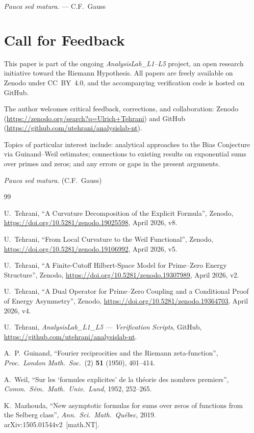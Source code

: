 \documentclass[11pt]{article}
\begin{document}
\emph{Pauca sed matura.} --- C.F.~Gauss

\section*{Call for Feedback}

This paper is part of the ongoing \textit{AnalysisLab\_L1--L5} project,
an open research initiative toward the Riemann Hypothesis.
All papers are freely available on Zenodo under CC~BY~4.0,
and the accompanying verification code is hosted on GitHub.

The author welcomes critical feedback, corrections, and collaboration:
Zenodo (\url{https://zenodo.org/search?q=Ulrich+Tehrani})
and GitHub (\url{https://github.com/utehrani/analysislab-nt}).

Topics of particular interest include: analytical approaches to the
Bias Conjecture via Guinand--Weil estimates; connections to existing
results on exponential sums over primes and zeros; and any errors or
gaps in the present arguments.

\noindent\textit{Pauca sed matura.} (C.F.\ Gauss)

\begin{thebibliography}{99}

U.~Tehrani,
``A Curvature Decomposition of the Explicit Formula'',
Zenodo, \url{https://doi.org/10.5281/zenodo.19025598},
April 2026, v8.

U.~Tehrani,
``From Local Curvature to the Weil Functional'',
Zenodo, \url{https://doi.org/10.5281/zenodo.19106992},
April 2026, v5.

U.~Tehrani,
``A Finite-Cutoff Hilbert-Space Model
for Prime--Zero Energy Structure'',
Zenodo, \url{https://doi.org/10.5281/zenodo.19307989},
April 2026, v2.

U.~Tehrani,
``A Dual Operator for Prime--Zero Coupling
and a Conditional Proof of Energy Asymmetry'',
Zenodo, \url{https://doi.org/10.5281/zenodo.19364703},
April 2026, v4.

U.~Tehrani,
\emph{AnalysisLab\_L1\_L5 --- Verification Scripts},
GitHub, \url{https://github.com/utehrani/analysislab-nt}.

A.~P.~Guinand,
``Fourier reciprocities and the Riemann zeta-function'',
\emph{Proc.\ London Math.\ Soc.}\ (2) \textbf{51} (1950), 401--414.

A.~Weil,
``Sur les `formules explicites' de la th\'eorie des nombres premiers'',
\emph{Comm.\ S\'em.\ Math.\ Univ.\ Lund}, 1952, 252--265.

K.~Mazhouda,
``New asymptotic formulas for sums over zeros of functions
from the Selberg class'',
\emph{Ann.\ Sci.\ Math.\ Qu\'ebec}, 2019.
arXiv:1505.01544v2~[math.NT].

\end{thebibliography}
\end{document}
